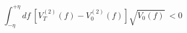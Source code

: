 \begin{equation}
 \int_{-\eta}^{+\eta} df ~ 
        [ V_T^{(2)} (f) - V_0^{(2)} (f) ] \sqrt{V_0 (f)} ~ < 0
\label{instabilitycondition}
\end{equation}

